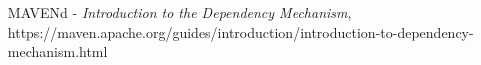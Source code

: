 \begin{itemize}
    \item[MAVENd] - \emph{Introduction to the Dependency Mechanism}, https://maven.apache.org/guides/introduction/introduction-to-dependency-mechanism.html
\end{itemize}

